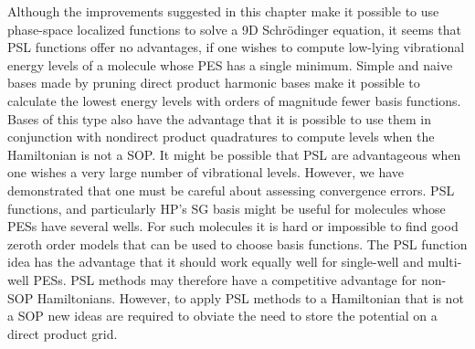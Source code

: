 Although the  improvements suggested in this chapter make it possible to use phase-space localized functions  to solve a 9D Schr\"{o}dinger equation, it seems that PSL functions
offer no advantages, if one wishes to compute low-lying 
%
vibrational energy levels of a molecule whose PES has a single minimum.    Simple and naive bases made by pruning direct product
harmonic bases make it possible to calculate the lowest energy levels with orders of magnitude fewer basis functions.   Bases of this type also have the advantage that it is 
possible to use them in conjunction with nondirect product quadratures to compute levels when the Hamiltonian is not a SOP.   It might be possible that PSL are advantageous when one 
wishes  a very large number of vibrational levels.   However, we have demonstrated that one must be careful about assessing convergence errors.   
%
%
PSL functions, and particularly HP's SG basis might be useful for molecules whose PESs have several wells.    For such molecules it is hard or impossible to find 
good zeroth order models that can be used to choose basis functions.   The PSL function idea has the advantage that it should work equally well for single-well and 
multi-well PESs.   PSL methods may therefore have a competitive advantage for non-SOP Hamiltonians.   However,  to apply 
PSL methods  to a   Hamiltonian that is not a  SOP new ideas are required to obviate the need to store the potential on a direct product grid.  






